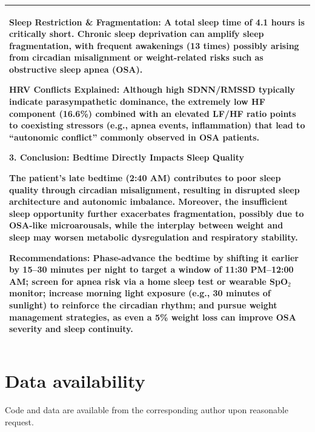 \documentclass[preprint,12pt]{elsarticle}
\begin{document}
\begin{table}[H]
\begin{tabular}{@{}p{\textwidth}@{}}
\textbf{Sleep Restriction \& Fragmentation:} A total sleep time of 4.1 hours is critically short. Chronic sleep deprivation can amplify sleep fragmentation, with frequent awakenings (13 times) possibly arising from circadian misalignment or weight-related risks such as obstructive sleep apnea (OSA).

\textbf{HRV Conflicts Explained:} Although high SDNN/RMSSD typically indicate parasympathetic dominance, the extremely low HF component (16.6\%) combined with an elevated LF/HF ratio points to coexisting stressors (e.g., apnea events, inflammation) that lead to “autonomic conflict” commonly observed in OSA patients.

\textbf{3. Conclusion: Bedtime Directly Impacts Sleep Quality}

The patient’s late bedtime (2:40 AM) contributes to poor sleep quality through circadian misalignment, resulting in disrupted sleep architecture and autonomic imbalance. Moreover, the insufficient sleep opportunity further exacerbates fragmentation, possibly due to OSA-like microarousals, while the interplay between weight and sleep may worsen metabolic dysregulation and respiratory stability.

\textbf{Recommendations:} Phase-advance the bedtime by shifting it earlier by 15--30 minutes per night to target a window of 11:30 PM--12:00 AM; screen for apnea risk via a home sleep test or wearable SpO$_2$ monitor; increase morning light exposure (e.g., 30 minutes of sunlight) to reinforce the circadian rhythm; and pursue weight management strategies, as even a 5\% weight loss can improve OSA severity and sleep continuity.
\\
\bottomrule
\end{tabular}
\end{table}

\section*{Data availability}
\noindent Code and data are available from the corresponding author upon reasonable request.
   
  






\end{document}
